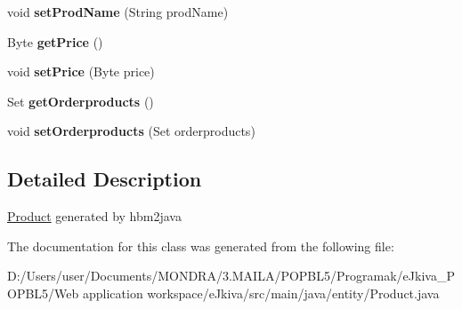 \begin{DoxyCompactItemize}
\item 
\mbox{\label{classentity_1_1_product_a1543a67426dc73be92263f46ab89fa91}} 
void {\bfseries set\+Prod\+Name} (String prod\+Name)
\item 
\mbox{\label{classentity_1_1_product_a37caae68537d3039c5ff4d0f7a7e08a5}} 
Byte {\bfseries get\+Price} ()
\item 
\mbox{\label{classentity_1_1_product_a31e32a4352c58dcf21cae188aebfd967}} 
void {\bfseries set\+Price} (Byte price)
\item 
\mbox{\label{classentity_1_1_product_a52a56edb9243b5cb98a98c2537a91062}} 
Set {\bfseries get\+Orderproducts} ()
\item 
\mbox{\label{classentity_1_1_product_aff3384ffaa013c53b169a753516ef730}} 
void {\bfseries set\+Orderproducts} (Set orderproducts)
\end{DoxyCompactItemize}


\subsection{Detailed Description}
\mbox{\hyperlink{classentity_1_1_product}{Product}} generated by hbm2java 

The documentation for this class was generated from the following file\+:\begin{DoxyCompactItemize}
\item 
D\+:/\+Users/user/\+Documents/\+M\+O\+N\+D\+R\+A/3.\+M\+A\+I\+L\+A/\+P\+O\+P\+B\+L5/\+Programak/e\+Jkiva\+\_\+\+P\+O\+P\+B\+L5/\+Web application workspace/e\+Jkiva/src/main/java/entity/Product.\+java\end{DoxyCompactItemize}
